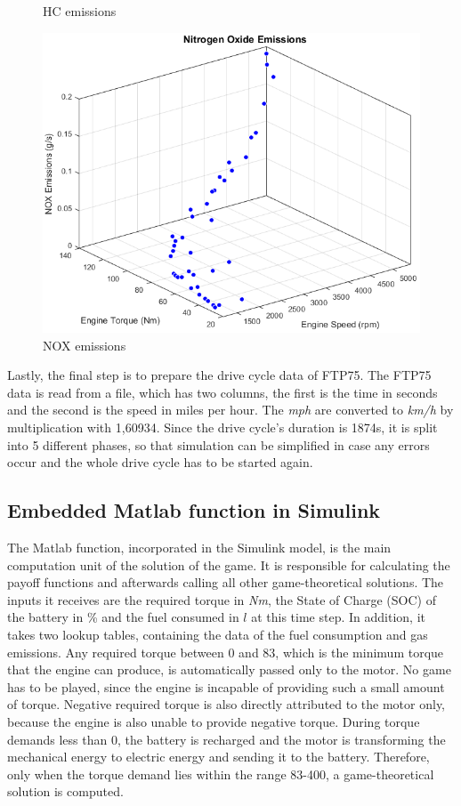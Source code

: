 \begin{figure}[!htb]
   \captionsetup{labelsep=space,justification=justified,singlelinecheck=off}
  \caption{HC emissions}\label{fig:awesome_image2}
\endminipage\hfill
{}%
  \includegraphics[scale=0.29]{figures/NOX}
   \captionsetup{labelsep=space,justification=justified,singlelinecheck=off}
  \caption{NOX emissions}\label{fig:awesome_image3}
\endminipage
\end{figure}

Lastly, the final step is to prepare the drive cycle data of FTP75. The FTP75 data is read from a file, which has two columns, the first is the time in seconds and the second is the speed in miles per hour. The \textit{mph} are converted to \textit{km/h} by multiplication with 1,60934. Since the drive cycle's duration is 1874s, it is split into 5 different phases, so that simulation can be simplified in case any errors occur and the whole drive cycle has to be started again. 

\subsection{Embedded Matlab function in Simulink}
The Matlab function, incorporated in the Simulink model, is the main computation unit of the solution of the game. It is responsible for calculating the payoff functions and afterwards calling all other game-theoretical solutions. The inputs it receives are the required torque in \textit{Nm}, the State of Charge (SOC) of the battery in \% and the fuel consumed in $l$ at this time step. In addition, it takes two lookup tables, containing the data of the fuel consumption and gas emissions. Any required torque between 0 and 83, which is the minimum torque that the engine can produce, is automatically passed only to the motor. No game has to be played, since the engine is incapable of providing such a small amount of torque. Negative required torque is also directly attributed to the motor only, because the engine is also unable to provide negative torque. During torque demands less than 0, the battery is recharged and the motor is transforming the mechanical energy to electric energy and sending it to the battery. Therefore, only when the torque demand lies within the range 83-400, a game-theoretical solution is computed.


